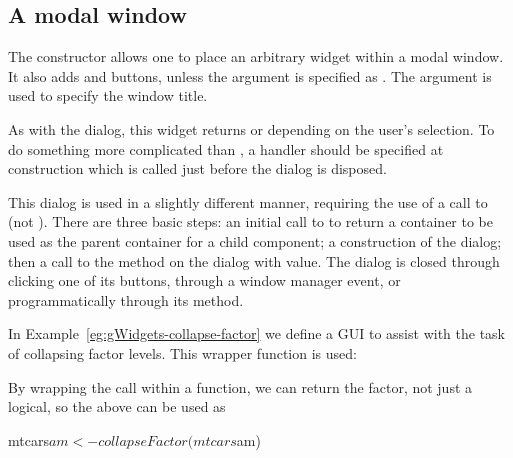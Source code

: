 \subsection{A modal window}
\label{sec:modal-window}


The  constructor allows one to place an
arbitrary widget within a modal window. It also adds  and
 buttons, unless the argument
 is specified as . The argument  is
used to specify the window title.



As with the  dialog, this widget returns
 or  depending on the user's selection. To do
something more complicated than , a handler should be
specified at construction which is called just before the dialog is
disposed.


This dialog is used in a slightly different manner, requiring the use
of a call to  (not ).
There are three basic steps: an initial call to
 to return a container to be used as the parent
container for a child component; a construction of the dialog; then a
call to the  method on the dialog with 
value. The dialog is closed through clicking one of its buttons,
through a window manager event, or programmatically through its
 method.

In Example~\ref{eg:gWidgets-collapse-factor} we define a GUI to assist
with the task of collapsing factor levels. This wrapper function is used:

\begin{Schunk}
\end{Schunk}

By wrapping the  call within a function, we can
return the factor, not just a logical, so the above can be used as
\begin{Schunk}
\begin{Sinput}
 mtcars$am <- collapseFactor(mtcars$am)
\end{Sinput}
\end{Schunk}



